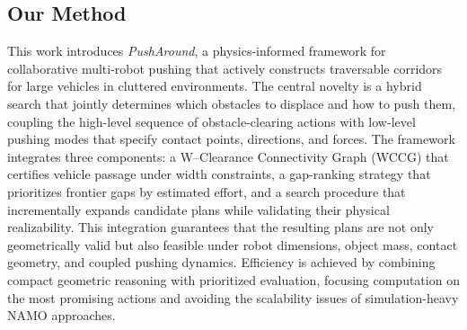 \begin{figure}[t!] %
\centering
{}
\caption{}
\end{figure}

\subsection{Our Method}\label{subsec:intro-our}
This work introduces \emph{PushAround}, a physics-informed framework for
collaborative multi-robot pushing that actively constructs traversable
corridors for large vehicles in cluttered environments. The central novelty is
a hybrid search that jointly determines which obstacles to displace and how to
push them, coupling the high-level sequence of obstacle-clearing actions with
low-level pushing modes that specify contact points, directions, and forces.
The framework integrates three components: a W--Clearance Connectivity Graph
(WCCG) that certifies vehicle passage under width constraints, a gap-ranking
strategy that prioritizes frontier gaps by estimated effort, and a search
procedure that incrementally expands candidate plans while validating their
physical realizability. This integration guarantees that the resulting plans
are not only geometrically valid but also feasible under robot dimensions,
object mass, contact geometry, and coupled pushing dynamics. Efficiency is
achieved by combining compact geometric reasoning with prioritized evaluation,
focusing computation on the most promising actions and avoiding the scalability
issues of simulation-heavy NAMO approaches.

